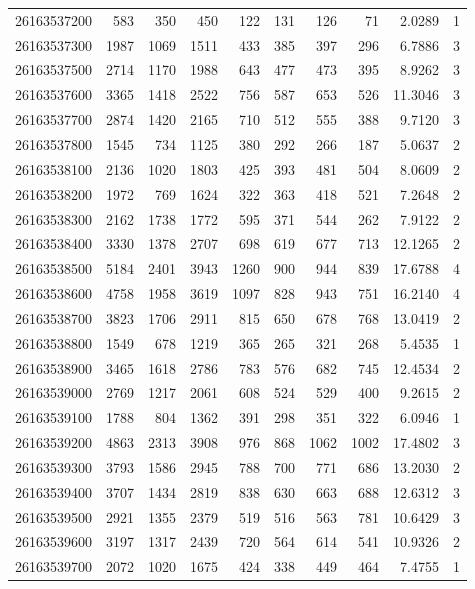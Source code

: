 \documentclass[11pt,landscape]{article}
\begin{document}
{\begin{longtable}[]{@{}lrrrrrrrrr@{}}
26163537200 & 583 & 350 & 450 & 122 & 131 & 126 & 71 & 2.0289 & 1 \\
26163537300 & 1987 & 1069 & 1511 & 433 & 385 & 397 & 296 & 6.7886 & 3 \\
26163537500 & 2714 & 1170 & 1988 & 643 & 477 & 473 & 395 & 8.9262 & 3 \\
26163537600 & 3365 & 1418 & 2522 & 756 & 587 & 653 & 526 & 11.3046 & 3 \\
26163537700 & 2874 & 1420 & 2165 & 710 & 512 & 555 & 388 & 9.7120 & 3 \\
26163537800 & 1545 & 734 & 1125 & 380 & 292 & 266 & 187 & 5.0637 & 2 \\
26163538100 & 2136 & 1020 & 1803 & 425 & 393 & 481 & 504 & 8.0609 & 2 \\
26163538200 & 1972 & 769 & 1624 & 322 & 363 & 418 & 521 & 7.2648 & 2 \\
26163538300 & 2162 & 1738 & 1772 & 595 & 371 & 544 & 262 & 7.9122 & 2 \\
26163538400 & 3330 & 1378 & 2707 & 698 & 619 & 677 & 713 & 12.1265 & 2 \\
26163538500 & 5184 & 2401 & 3943 & 1260 & 900 & 944 & 839 & 17.6788 & 4 \\
26163538600 & 4758 & 1958 & 3619 & 1097 & 828 & 943 & 751 & 16.2140 & 4 \\
26163538700 & 3823 & 1706 & 2911 & 815 & 650 & 678 & 768 & 13.0419 & 2 \\
26163538800 & 1549 & 678 & 1219 & 365 & 265 & 321 & 268 & 5.4535 & 1 \\
26163538900 & 3465 & 1618 & 2786 & 783 & 576 & 682 & 745 & 12.4534 & 2 \\
26163539000 & 2769 & 1217 & 2061 & 608 & 524 & 529 & 400 & 9.2615 & 2 \\
26163539100 & 1788 & 804 & 1362 & 391 & 298 & 351 & 322 & 6.0946 & 1 \\
26163539200 & 4863 & 2313 & 3908 & 976 & 868 & 1062 & 1002 & 17.4802 & 3 \\
26163539300 & 3793 & 1586 & 2945 & 788 & 700 & 771 & 686 & 13.2030 & 2 \\
26163539400 & 3707 & 1434 & 2819 & 838 & 630 & 663 & 688 & 12.6312 & 3 \\
26163539500 & 2921 & 1355 & 2379 & 519 & 516 & 563 & 781 & 10.6429 & 3 \\
26163539600 & 3197 & 1317 & 2439 & 720 & 564 & 614 & 541 & 10.9326 & 2 \\
26163539700 & 2072 & 1020 & 1675 & 424 & 338 & 449 & 464 & 7.4755 & 1 \\

\end{longtable}}
\end{document}
